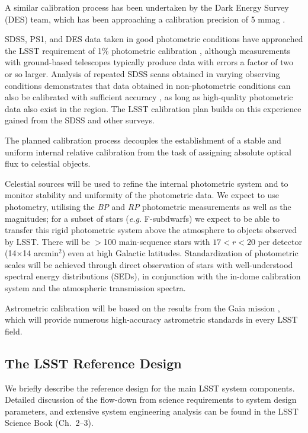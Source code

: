 A similar calibration process has been undertaken by the Dark Energy
Survey (DES) team, which has been approaching a calibration
precision of 5 mmag \citep{2018AJ....155...41B}.

SDSS, PS1, and DES data
taken in good photometric conditions have approached the LSST
requirement of 1\% photometric calibration
\citep{2008ApJ...674.1217P,2012ApJ...756..158S,2018AJ....155...41B}, although measurements with ground-based telescopes
typically produce data with errors a factor of two or so larger. Analysis of
repeated SDSS scans obtained in varying observing conditions demonstrates that data
obtained in
non-photometric conditions can also be calibrated with
sufficient accuracy \citep{2007AJ....134..973I}, as long as high-quality
photometric data also exist in the region.
The LSST calibration plan builds on this experience gained from the SDSS and other surveys.

The planned calibration process decouples the establishment of a stable and uniform internal
relative calibration from the task of assigning absolute optical flux to
celestial objects.

Celestial sources will be used to refine the internal photometric system and
to monitor stability and uniformity of the photometric data. We expect to use \citet{2016A&A...595A...2G} photometry, utilising
the \textit{BP} and \textit{RP} photometric measurements as well as the  magnitudes; for a subset
of stars (\textit{e.g.} F-subdwarfs) we expect to be able to transfer this rigid photometric system above
the atmosphere to objects observed by LSST.
There will be
$>$100 main-sequence stars with $17<r<20$ per detector (14$\times$14 arcmin$^2$)
even at high Galactic latitudes. Standardization of photometric scales will be
achieved through direct observation of stars with well-understood spectral
energy distributions (SEDs), in conjunction with the in-dome calibration system and the atmospheric transmission spectra.

Astrometric calibration will be based on the results from the Gaia mission \citep{2018A&A...616A...2L}, which will provide
numerous high-accuracy astrometric standards in every LSST field.

\subsection{The LSST  Reference Design}

We briefly describe the reference design for the main LSST system components.
Detailed discussion of the flow-down from science requirements to system
design parameters, and extensive system engineering analysis can be
found in the LSST Science Book (Ch.~2--3).

